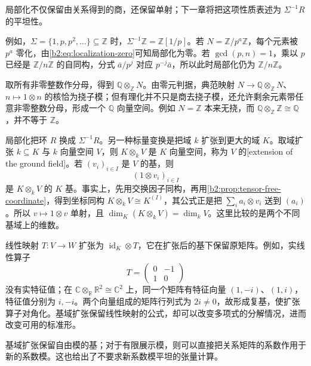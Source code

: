 局部化不仅保留由关系得到的商，还保留单射；下一章将把这项性质表述为 \(\Sigma^{-1}R\) 的平坦性。

\ProseParagraphBreak
例如，\(\Sigma=\{1,p,p^2,\ldots\}\subseteq\mathbb Z\) 时，\(\Sigma^{-1}\mathbb Z=\mathbb Z[1/p]\)。若 \(N=\mathbb Z/p^a\mathbb Z\)，每个元素被 \(p^a\) 零化，由\eqref{b2:eq:localization-zero}可知局部化为零。若 \(\gcd(p,n)=1\)，乘以 \(p\) 已经是 \(\mathbb Z/n\mathbb Z\) 的自同构，分式 \(\bar a/p^j\) 对应 \(p^{-j}\bar a\)，所以此时局部化仍为 \(\mathbb Z/n\mathbb Z\)。

\ProseParagraphBreak
取所有非零整数作分母，得到 \(\mathbb Q\otimes_{\mathbb Z}N\)。由零元判据，典范映射 \(N\to\mathbb Q\otimes_{\mathbb Z}N\)、\(n\mapsto1\otimes n\) 的核恰为挠子模；但有理化并不只是商去挠子模，还允许剩余元素带任意非零整数分母，形成一个 \(\mathbb Q\) 向量空间。例如 \(N=\mathbb Z\) 本来无挠，而 \(\mathbb Q\otimes_{\mathbb Z}\mathbb Z\cong\mathbb Q\)，并不等于 \(\mathbb Z\)。

\ProseParagraphBreak
局部化把环 \(R\) 换成 \(\Sigma^{-1}R\)。另一种标量变换是把域 \(k\) 扩张到更大的域 \(K\)。取域扩张 \(k\subseteq K\) 与 \(k\) 向量空间 \(V\)，则 \(K\otimes_kV\) 是 \(K\) 向量空间，称为 \(V\) 的[extension of the ground field]。若 \((v_i)_{i\in I}\) 是 \(V\) 的基，则
\[
	(1\otimes v_i)_{i\in I}
\]
是 \(K\otimes_kV\) 的 \(K\) 基。事实上，先用交换因子同构，再用\cref{b2:prop:tensor-free-coordinate}，得到坐标同构 \(K\otimes_kV\cong K^{(I)}\)，其公式正是把 \(\sum_i a_i\otimes v_i\) 送到 \((a_i)\)。所以 \(v\mapsto1\otimes v\) 单射，且 \(\dim_K(K\otimes_kV)=\dim_kV\)。这里比较的是两个不同基域上的维数。

\ProseParagraphBreak
线性映射 \(T:V\to W\) 扩张为 \(\operatorname{id}_K\otimes T\)，它在扩张后的基下保留原矩阵。例如，实线性算子
\[
	T=\begin{pmatrix}0&-1\\1&0\end{pmatrix}
\]
没有实特征值；在 \(\mathbb C\otimes_{\mathbb R}\mathbb R^2\cong\mathbb C^2\) 上，同一个矩阵有特征向量 \((1,-i)\)、\((1,i)\)，特征值分别为 \(i,-i\)。两个向量组成的矩阵行列式为 \(2i\ne0\)，故形成复基，使扩张算子对角化。基域扩张保留线性映射的公式，却可以改变多项式的分解情况，进而改变可用的标准形。

\ProseParagraphBreak
基域扩张保留自由模的基；对于有限展示模，则可以直接把关系矩阵的系数作用于新的系数模。这也给出了不要求新系数模平坦的张量计算。

